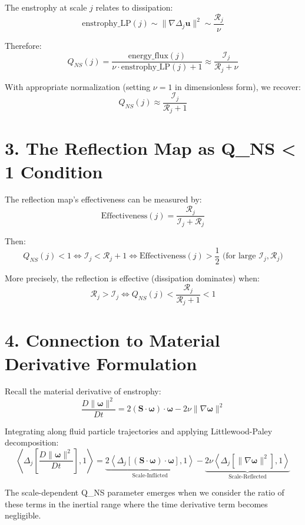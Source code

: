 \documentclass[11pt]{article}
\begin{document}
The enstrophy at scale \(j\) relates to dissipation:
\[
\text{enstrophy\_LP}(j) \sim \|\nabla \Delta_j\mathbf{u}\|^2 \sim \frac{\mathcal{R}_j}{\nu}
\]

Therefore:
\[
Q_{NS}(j) = \frac{\text{energy\_flux}(j)}{\nu \cdot \text{enstrophy\_LP}(j) + 1} \approx \frac{\mathcal{I}_j}{\mathcal{R}_j + \nu}
\]

With appropriate normalization (setting \(\nu = 1\) in dimensionless form), we recover:
\[
Q_{NS}(j) \approx \frac{\mathcal{I}_j}{\mathcal{R}_j + 1}
\]

\section{3. The Reflection Map as Q_{NS} < 1 Condition}

The reflection map's effectiveness can be measured by:
\[
\text{Effectiveness}(j) = \frac{\mathcal{R}_j}{\mathcal{I}_j + \mathcal{R}_j}
\]

Then:
\[
Q_{NS}(j) < 1 \iff \mathcal{I}_j < \mathcal{R}_j + 1 \iff \text{Effectiveness}(j) > \frac{1}{2} \text{ (for large } \mathcal{I}_j, \mathcal{R}_j\text{)}
\]

More precisely, the reflection is effective (dissipation dominates) when:
\[
\mathcal{R}_j > \mathcal{I}_j \iff Q_{NS}(j) < \frac{\mathcal{R}_j}{\mathcal{R}_j + 1} < 1
\]

\section{4. Connection to Material Derivative Formulation}

Recall the material derivative of enstrophy:
\[
\frac{D\|\boldsymbol{\omega}\|^2}{Dt} = 2(\mathbf{S} \cdot \boldsymbol{\omega}) \cdot \boldsymbol{\omega} - 2\nu \|\nabla \boldsymbol{\omega}\|^2
\]

Integrating along fluid particle trajectories and applying Littlewood-Paley decomposition:
\[
\left\langle \Delta_j\left[\frac{D\|\boldsymbol{\omega}\|^2}{Dt}\right], 1 \right\rangle = \underbrace{2\left\langle \Delta_j[(\mathbf{S} \cdot \boldsymbol{\omega}) \cdot \boldsymbol{\omega}], 1 \right\rangle}_{\text{Scale-Inflicted}} - \underbrace{2\nu\left\langle \Delta_j[\|\nabla \boldsymbol{\omega}\|^2], 1 \right\rangle}_{\text{Scale-Reflected}}
\]

The scale-dependent Q_{NS} parameter emerges when we consider the ratio of these terms in the inertial range where the time derivative term becomes negligible.
\end{document}
